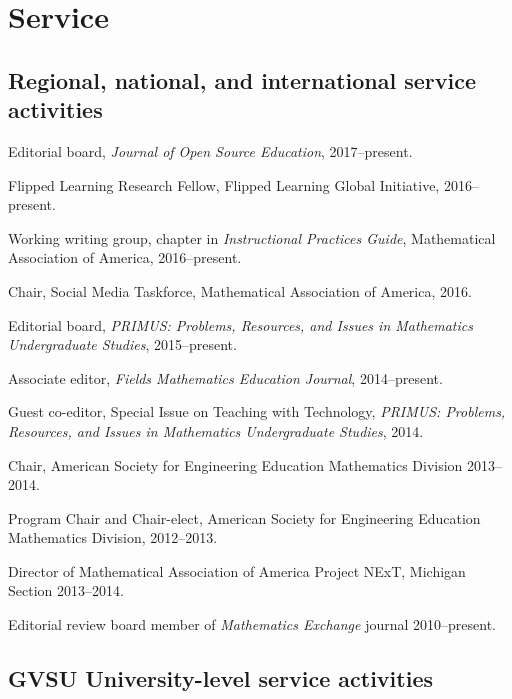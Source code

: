 \documentclass[letterpaper]{article}
\renewenvironment{itemize}{
  \begin{list}{}{
    \setlength{\leftmargin}{1.5em}
	\setlength{\itemsep}{0in}
  }
}{
  \end{list}
}
\begin{document}


\section*{Service}

\subsection*{Regional, national, and international service activities}
\begin{itemize}
	\item Editorial board, \emph{Journal of Open Source Education}, 2017--present. 
	\item Flipped Learning Research Fellow, Flipped Learning Global Initiative, 2016--present.
	\item Working writing group, chapter in \textit{Instructional Practices Guide}, Mathematical Association of America, 2016--present.
	\item Chair, Social Media Taskforce, Mathematical Association of America, 2016.
	\item Editorial board, \emph{PRIMUS: Problems, Resources, and Issues in Mathematics Undergraduate Studies}, 2015--present.
	\item Associate editor, \emph{Fields Mathematics Education Journal}, 2014--present.
	\item Guest co-editor, Special Issue on Teaching with Technology, \emph{PRIMUS: Problems, Resources, and Issues in Mathematics Undergraduate Studies}, 2014.
	\item Chair, American Society for Engineering Education Mathematics Division 2013--2014.
	\item Program Chair and Chair-elect, American Society for Engineering Education Mathematics Division, 2012--2013.
	\item Director of Mathematical Association of America Project NExT, Michigan Section 2013--2014.
	\item Editorial review board member of \emph{Mathematics Exchange} journal 2010--present.
\end{itemize}

\subsection*{GVSU University-level service activities}
\end{document}
